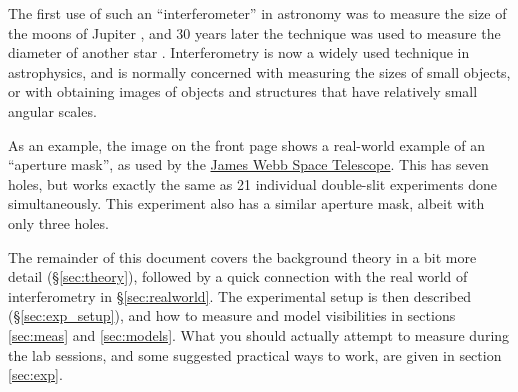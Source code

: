 \documentclass[11pt]{article}
\begin{document}
The first use of such an ``interferometer'' in astronomy was to measure the size of the moons of Jupiter \citep{1891PASP....3..274M,1891Natur..45..160M}, and 30 years later the technique was used to measure the diameter of another star \citep{1921ApJ....53..249M}. Interferometry is now a widely used technique in astrophysics, and is normally concerned with measuring the sizes of small objects, or with obtaining images of objects and structures that have relatively small angular scales.



As an example, the image on the front page shows a real-world example of an ``aperture mask'', as used by the \href{https://jwst-docs.stsci.edu/jwst-near-infrared-imager-and-slitless-spectrograph/niriss-observing-modes/niriss-aperture-masking-interferometry}{James Webb Space Telescope}. This has seven holes, but works exactly the same as 21 individual double-slit experiments done simultaneously. This experiment also has a similar aperture mask, albeit with only three holes.

The remainder of this document covers the background theory in a bit more detail (\S \ref{sec:theory}), followed by a quick connection with the real world of interferometry in \S \ref{sec:realworld}. The experimental setup is then described (\S \ref{sec:exp_setup}), and how to measure and model visibilities in sections \ref{sec:meas} and \ref{sec:models}. What you should actually attempt to measure during the lab sessions, and some suggested practical ways to work, are given in section \ref{sec:exp}.
\end{document}
